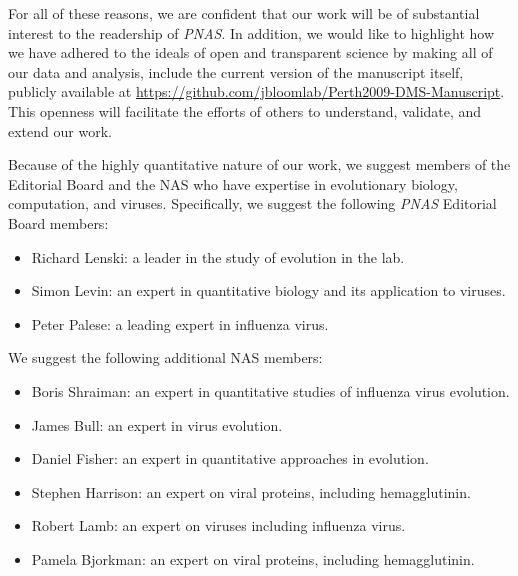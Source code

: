 \documentclass[a4paper,11pt]{letter}
\begin{document}
\begin{letter}{}
For all of these reasons, we are confident that our work will be of substantial interest to the readership of \textit{PNAS}.
In addition, we would like to highlight how we have adhered to the ideals of open and transparent science by making all of our data and analysis, include the current version of the manuscript itself, publicly available at \url{https://github.com/jbloomlab/Perth2009-DMS-Manuscript}. 
This openness will facilitate the efforts of others to understand, validate, and extend our work.

Because of the highly quantitative nature of our work, we suggest members of the Editorial Board and the NAS who have expertise in evolutionary biology, computation, and viruses. 
Specifically, we suggest the following \textit{PNAS} Editorial Board members:
\begin{itemize}
\item Richard Lenski: a leader in the study of evolution in the lab.
\item Simon Levin: an expert in quantitative biology and its application to viruses.
\item Peter Palese: a leading expert in influenza virus.
\end{itemize}

We suggest the following additional NAS members:
\begin{itemize}
\item Boris Shraiman: an expert in quantitative studies of influenza virus evolution.
\item James Bull: an expert in virus evolution.
\item Daniel Fisher: an expert in quantitative approaches in evolution.
\item Stephen Harrison: an expert on viral proteins, including hemagglutinin.
\item Robert Lamb: an expert on viruses including influenza virus.
\item Pamela Bjorkman: an expert on viral proteins, including hemagglutinin.
\end{itemize}


\end{letter}
\end{document}
